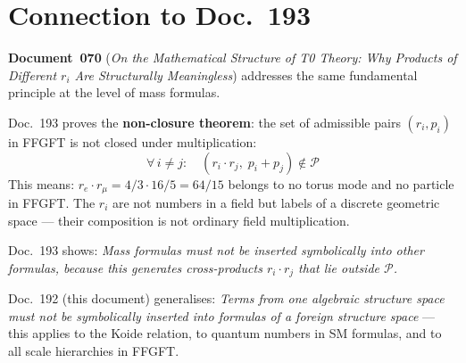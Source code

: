 \begin{center}
\end{center}


\section*{Connection to Doc.~193}

\textbf{Document~070} (\textit{On the Mathematical Structure of T0 Theory:
Why Products of Different $r_i$ Are Structurally Meaningless})
addresses the same fundamental principle at the level of mass formulas.

Doc.~193 proves the \textbf{non-closure theorem}: the set of admissible
pairs $(r_i, p_i)$ in FFGFT is not closed under multiplication:
\[
  \forall\, i \neq j:\quad (r_i \cdot r_j,\; p_i + p_j) \notin \mathcal{P}
\]
This means: $r_e \cdot r_\mu = 4/3 \cdot 16/5 = 64/15$ belongs to
no torus mode and no particle in FFGFT. The $r_i$ are not numbers in
a field but labels of a discrete geometric space --- their composition
is not ordinary field multiplication.

Doc.~193 shows: \emph{Mass formulas must not be inserted symbolically
into other formulas, because this generates cross-products $r_i \cdot r_j$
that lie outside $\mathcal{P}$.}

Doc.~192 (this document) generalises: \emph{Terms from one algebraic
structure space must not be symbolically inserted into formulas of a
foreign structure space} --- this applies to the Koide relation, to
quantum numbers in SM formulas, and to all scale hierarchies in FFGFT.


